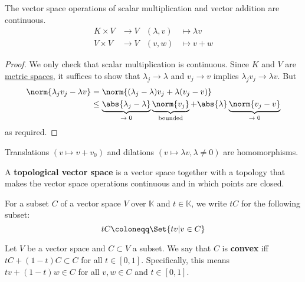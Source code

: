\documentclass{article}
\newcommand{\K}{\mathbb{K}}
\begin{document}
\begin{fact}
    The vector space operations of scalar multiplication and vector addition are continuous.
    \begin{align*}
        K \times V &\to V & (\lambda, v) &\mapsto \lambda v \\
        V \times V &\to V & (v, w) &\mapsto v + w
    \end{align*}
\end{fact}
\begin{proof}
    We only check that scalar multiplication is continuous. Since $K$ and $V$ are \hyperlink{def:metric-on-vector-space}{metric spaces}, it suffices to show that $\lambda_j \to \lambda$ and $v_j \to v$ implies $\lambda_j v_j \to \lambda v$. But
    \begin{align*}
        \norm{\lambda_j v_j - \lambda v} &= \norm{(\lambda_j - \lambda) v_j + \lambda(v_j - v)} \\
                                         &\leq \underbrace{\abs{\lambda_j - \lambda}}_\text{$\to 0$} \underbrace{\norm{v_j}}_\text{bounded} + \abs{\lambda} \underbrace{\norm{v_j - v}}_\text{$\to 0$}
    \end{align*}
    as required.
\end{proof}
\begin{cor}
    Translations $(v \mapsto v + v_0)$ and dilations $(v \mapsto \lambda v, \lambda \ne 0)$ are homomorphisms.
\end{cor}

\begin{defi}
    A \textbf{topological vector space} is a vector space together with a topology that makes the vector space operations continuous and in which points are closed.
\end{defi}

\begin{notation}
    For a subset $C$ of a vector space $V$ over $\K$ and $t \in \K$, we write $t C$ for the following subset:
    \begin{equation*}
        t C \coloneqq \Set{t v | v \in C}
    \end{equation*}
\end{notation}
\begin{defi}
    Let $V$ be a vector space and $C \subset V$ a subset.  We say that $C$ is \textbf{convex} iff $t C + (1-t) C \subset C$ for all $t \in [0, 1]$. Specifically, this means $t v + (1-t) w \in C$ for all $v, w \in C$ and $t \in [0, 1]$.
\end{defi}
\end{document}

